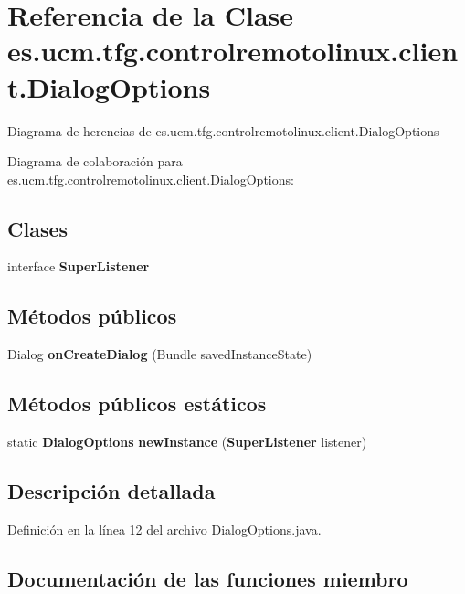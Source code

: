 \section{Referencia de la Clase es.\-ucm.\-tfg.\-controlremotolinux.\-client.\-Dialog\-Options}
\label{classes_1_1ucm_1_1tfg_1_1controlremotolinux_1_1client_1_1DialogOptions}


Diagrama de herencias de es.\-ucm.\-tfg.\-controlremotolinux.\-client.\-Dialog\-Options


Diagrama de colaboración para es.\-ucm.\-tfg.\-controlremotolinux.\-client.\-Dialog\-Options\-:
\subsection*{Clases}
\begin{DoxyCompactItemize}
\item 
interface {\bf Super\-Listener}
\end{DoxyCompactItemize}
\subsection*{Métodos públicos}
\begin{DoxyCompactItemize}
\item 
Dialog {\bf on\-Create\-Dialog} (Bundle saved\-Instance\-State)
\end{DoxyCompactItemize}
\subsection*{Métodos públicos estáticos}
\begin{DoxyCompactItemize}
\item 
static {\bf Dialog\-Options} {\bf new\-Instance} ({\bf Super\-Listener} listener)
\end{DoxyCompactItemize}


\subsection{Descripción detallada}


Definición en la línea 12 del archivo Dialog\-Options.\-java.



\subsection{Documentación de las funciones miembro}
